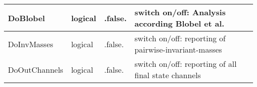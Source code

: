 \documentclass{article}
\begin{document}
\begin{longtable}{llll}
\midrule
DoBlobel & \begin{minipage}[t]{2cm}logical\end{minipage} & \begin{minipage}[t]{2cm}.false.\end{minipage} & \begin{minipage}[t]{12cm}switch on/off: Analysis according Blobel et al.\end{minipage}\\*
\midrule
DoInvMasses & \begin{minipage}[t]{2cm}logical\end{minipage} & \begin{minipage}[t]{2cm}.false.\end{minipage} & \begin{minipage}[t]{12cm}switch on/off: reporting of pairwise-invariant-masses\end{minipage}\\*
\midrule
DoOutChannels & \begin{minipage}[t]{2cm}logical\end{minipage} & \begin{minipage}[t]{2cm}.false.\end{minipage} & \begin{minipage}[t]{12cm}switch on/off: reporting of all final state channels\end{minipage}\\*
\bottomrule
\end{longtable}
{ }



\end{document}

